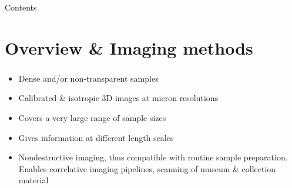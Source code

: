 \begin{frame}{Contents}
	\tableofcontents
\end{frame}

\section{Overview \& Imaging methods}
\begin{frame}
	\frametitle{\uct}
	\begin{itemize}
		\item Dense and/or non‐transparent samples
		\item Calibrated \& isotropic 3D images at micron resolutions
		\item Covers a very large range of sample sizes
		\item Gives information at different length scales
	 	\item Nondestructive imaging, thus compatible with routine sample preparation.\newline
			Enables correlative imaging pipelines, scanning of museum \& collection material
	\end{itemize}
\end{frame}

